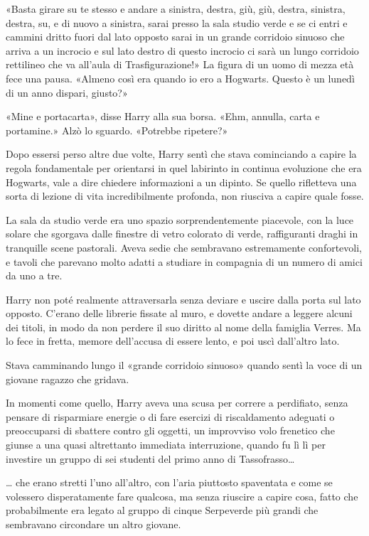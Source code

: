 «Basta girare su te stesso e andare a sinistra, destra, giù, giù, destra, sinistra, destra, su, e di nuovo a sinistra, sarai presso la sala studio verde e se ci entri e cammini dritto fuori dal lato opposto sarai in un grande corridoio sinuoso che arriva a un incrocio e sul lato destro di questo incrocio ci sarà un lungo corridoio rettilineo che va all’aula di Trasfigurazione!» La figura di un uomo di mezza età fece una pausa. «Almeno così era quando io ero a Hogwarts. Questo è un lunedì di un anno dispari, giusto?»

«Mine e portacarta», disse Harry alla sua borsa. «Ehm, annulla, carta e portamine.» Alzò lo sguardo. «Potrebbe ripetere?»

Dopo essersi perso altre due volte, Harry sentì che stava cominciando a capire la regola fondamentale per orientarsi in quel labirinto in continua evoluzione che era Hogwarts, vale a dire chiedere informazioni a un dipinto. Se quello rifletteva una sorta di lezione di vita incredibilmente profonda, non riusciva a capire quale fosse.

La sala da studio verde era uno spazio sorprendentemente piacevole, con la luce solare che sgorgava dalle finestre di vetro colorato di verde, raffiguranti draghi in tranquille scene pastorali. Aveva sedie che sembravano estremamente confortevoli, e tavoli che parevano molto adatti a studiare in compagnia di un numero di amici da uno a tre.

Harry non poté realmente attraversarla senza deviare e uscire dalla porta sul lato opposto. C’erano delle librerie fissate al muro, e dovette andare a leggere alcuni dei titoli, in modo da non perdere il suo diritto al nome della famiglia Verres. Ma lo fece in fretta, memore dell’accusa di essere lento, e poi uscì dall’altro lato.

Stava camminando lungo il «grande corridoio sinuoso» quando sentì la voce di un giovane ragazzo che gridava.

In momenti come quello, Harry aveva una scusa per correre a perdifiato, senza pensare di risparmiare energie o di fare esercizi di riscaldamento adeguati o preoccuparsi di sbattere contro gli oggetti, un improvviso volo frenetico che giunse a una quasi altrettanto immediata interruzione, quando fu lì lì per investire un gruppo di sei studenti del primo anno di Tassofrasso…

… che erano stretti l’uno all’altro, con l’aria piuttosto spaventata e come se volessero disperatamente fare qualcosa, ma senza riuscire a capire cosa, fatto che probabilmente era legato al gruppo di cinque Serpeverde più grandi che sembravano circondare un altro giovane.

